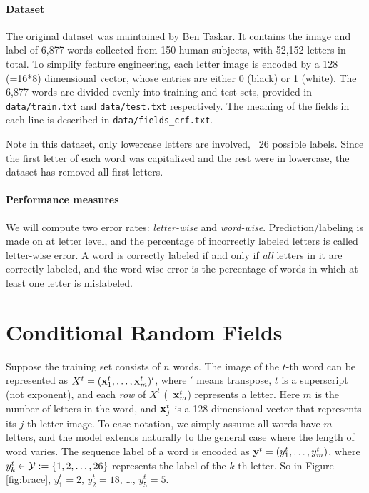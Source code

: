 \documentclass[11pt]{report}
\begin{document}
\paragraph{Dataset}
The original dataset was maintained by \href{https://en.wikipedia.org/wiki/Ben_Taskar}{Ben Taskar}.
It contains the image and label of 6,877 words collected from 150 human subjects,
with 52,152 letters in total.
To simplify feature engineering, each letter image is encoded by a 128 (=16*8) dimensional vector,
whose entries are either 0 (black) or 1 (white).
The 6,877 words are divided evenly into training and test sets,
provided in \verb#data/train.txt# and \verb#data/test.txt# respectively.
The meaning of the fields in each line is described in \verb#data/fields_crf.txt#.


Note in this dataset, only lowercase letters are involved, \ie\ 26 possible labels.
Since the first letter of each word was capitalized and the rest were in lowercase,
the dataset has removed all first letters.


\paragraph{Performance measures}
%
We will compute two error rates: \emph{letter-wise} and \emph{word-wise}.
Prediction/labeling is made on at letter level,
and the percentage of incorrectly labeled letters is called letter-wise error.
A word is correctly labeled if and only if \emph{all} letters in it are correctly labeled,
and the word-wise error is the percentage of words in which at least one letter is mislabeled.


\section{Conditional Random Fields}

Suppose the training set consists of $n$ words.
The image of the $t$-th word can be represented as
$X^t = (\mathbf{\boldsymbol{x}}^t_1, \ldots, \mathbf{\boldsymbol{x}}^t_m)'$,
where $'$ means transpose,
$t$ is a superscript (not exponent),
and each \emph{row} of $X^t$ (\eg\ $\mathbf{\boldsymbol{x}}^t_m$) represents a letter.
Here $m$ is the number of letters in the word,
and $\mathbf{\boldsymbol{x}}^t_j$ is a 128 dimensional vector that represents its $j$-th letter image.
To ease notation, we simply assume all words have $m$ letters,
and the model extends naturally to the general case where the length of word varies.
The sequence label of a word is encoded as
$\mathbf{\boldsymbol{y}}^t = (y^t_1, \ldots, y^t_m)$,
where $y^t_k \in \mathcal{Y} := \{1, 2, \ldots, 26\}$ represents the label of the $k$-th letter.
So in Figure \ref{fig:brace}, $y^t_1 = 2$, $y^t_2 = 18$, \ldots, $y^t_5 = 5$.
\end{document}
